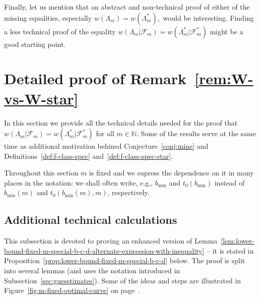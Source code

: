 \documentclass[a4paper]{amsart} %
\theoremstyle{definition}
\theoremstyle{remark}
\numberwithin{equation}{section}
\newcommand*{\NN}{\mathbb{N}}
\newcommand*{\weakconst}[1]{w(#1)} %
\newcommand*{\weakconstrestricted}[2]{w(#1|#2)} %
\newcommand*{\fclassspec}[1]{\mathcal{F}_{#1}}
\newcommand*{\fclassspecStar}[1]{\mathcal{F}_{#1}^*}
\newcommand*{\bMin}{b_{\min}}
\begin{document}

Finally, let us mention
that an abstract and non-technical proof of either of the missing equalities, especially $\weakconst{\Lambda_m} 
=\weakconst{\Lambda_m^*},$ would be interesting.
Finding a less technical proof of the equality
$\weakconstrestricted{\Lambda_m}{\fclassspec{m}}
= \weakconstrestricted{\Lambda_m^*}{\fclassspecStar{m}}$
might be a good starting point.

%
%
%
%
%
%



\appendix

	


%
%
%
%
% 
%
%
%

\section{Detailed proof of Remark~\ref{rem:W-vs-W-star}}

\label{APP:equality}

In this section we provide all the technical details needed for the proof that $\weakconstrestricted{\Lambda_m}{\fclassspec{m}}
= \weakconstrestricted{\Lambda_m^*}{\fclassspecStar{m}}$ for all $m\in\NN$.
Some of the results serve at the same time as additional motivation behined Conjecture~\ref{conj:mine} and Definitions~\ref{def:f-class-spec} and~\ref{def:f-class-spec-star}.

Throughout this section $m$ is fixed 
and we supress the dependence on it in many places in the notation:
we shall often write, e.g.,
$\bMin$ and $t_0(\bMin)$ instead of
$\bMin(m)$ and $t_0(\bMin(m), m)$, respectively.


\subsection{Additional technical calculations}


This subsection is devoted to proving an enhanced version of Lemma~\ref{lem:lower-bound-fixed-m-special-b-c-d-alternate-expression-with-inequality} --
it is 
stated in Proposition~\ref{prop:lower-bound-fixed-m-special-b-c-d} below.
The proof is split into several lemmas (and uses the notation introduced in Subsection~\ref{sec:guesstimates}).
Some of the ideas and steps are illustrated in Figure~\ref{fig:m-fixed-optimal-curve} on page~\pageref{fig:m-fixed-optimal-curve}.
\end{document}
